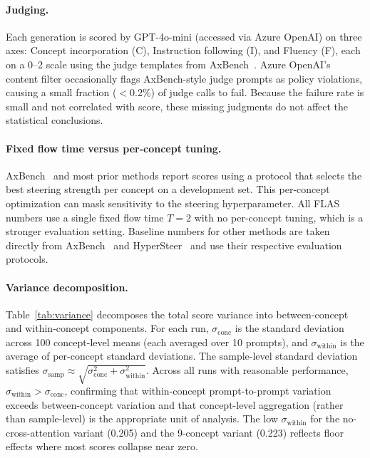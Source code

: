 \documentclass{article}
\begin{document}
\paragraph{Judging.}
Each generation is scored by GPT-4o-mini (accessed via Azure OpenAI) on three axes: Concept incorporation (C), Instruction following (I), and Fluency (F), each on a 0--2 scale using the judge templates from AxBench~\citep{Wu2025}. Azure OpenAI's content filter occasionally flags AxBench-style judge prompts as policy violations, causing a small fraction ($<$0.2\%) of judge calls to fail. Because the failure rate is small and not correlated with score, these missing judgments do not affect the statistical conclusions.

\paragraph{Fixed flow time versus per-concept tuning.}
AxBench~\citep{Wu2025} and most prior methods report scores using a protocol that selects the best steering strength per concept on a development set. This per-concept optimization can mask sensitivity to the steering hyperparameter. All FLAS numbers use a single fixed flow time $T\!=\!2$ with no per-concept tuning, which is a stronger evaluation setting. Baseline numbers for other methods are taken directly from AxBench~\citep{Wu2025} and HyperSteer~\citep{Sun2025} and use their respective evaluation protocols.

\paragraph{Variance decomposition.}
Table~\ref{tab:variance} decomposes the total score variance into between-concept and within-concept components. For each run, $\sigma_{\text{conc}}$ is the standard deviation across 100 concept-level means (each averaged over 10 prompts), and $\sigma_{\text{within}}$ is the average of per-concept standard deviations. The sample-level standard deviation satisfies $\sigma_{\text{samp}} \approx \sqrt{\sigma_{\text{conc}}^2 + \sigma_{\text{within}}^2}$. Across all runs with reasonable performance, $\sigma_{\text{within}} > \sigma_{\text{conc}}$, confirming that within-concept prompt-to-prompt variation exceeds between-concept variation and that concept-level aggregation (rather than sample-level) is the appropriate unit of analysis. The low $\sigma_{\text{within}}$ for the no-cross-attention variant (0.205) and the 9-concept variant (0.223) reflects floor effects where most scores collapse near zero.
\end{document}
